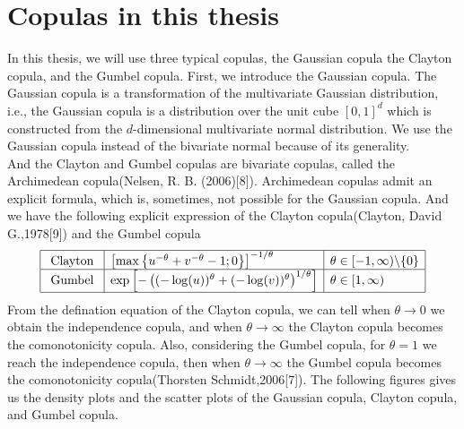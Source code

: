 \documentclass[mstat,12pt]{unswthesis}  %
\numberwithin{equation}{section}
\begin{document}
\section{Copulas in this thesis}
In this thesis, we will use three typical copulas, the Gaussian copula the Clayton copula, and the Gumbel copula. 
First, we introduce the Gaussian copula. The Gaussian copula is a transformation of the multivariate Gaussian distribution, i.e., the Gaussian copula is a distribution over the unit cube $[0,1]^d$ which is constructed from the $d$-dimensional multivariate normal distribution. We use the Gaussian copula instead of the bivariate normal because of its generality.\\
And the Clayton and Gumbel copulas are bivariate copulas, called the Archimedean copula(Nelsen, R. B. (2006)[8]). Archimedean copulas admit an explicit formula, which is, sometimes, not possible for the Gaussian copula. And we have the following explicit expression of the Clayton copula(Clayton, David G.,1978[9]) and the Gumbel copula
\begin{equation}
\begin{array}{|l|l|l|}
\hline \text { Clayton } & {\left[\max \left\{u^{-\theta}+v^{-\theta}-1 ; 0\right\}\right]^{-1 / \theta}} & \theta \in[-1, \infty) \backslash\{0\} \\
\hline \text { Gumbel } & \exp \left[-\left((-\log (u))^{\theta}+(-\log (v))^{\theta}\right)^{1 / \theta}\right] & \theta \in[1, \infty) \\
\hline
\end{array}
\end{equation}
From the defination equation of the Clayton copula, we can tell when $\theta \rightarrow 0$ we obtain the independence copula, and when $\theta \rightarrow \infty$ the Clayton copula becomes the comonotonicity copula. Also, considering the Gumbel copula, for $\theta=1$ we reach the independence copula, then when $\theta \rightarrow \infty$ the Gumbel copula becomes the comonotonicity copula(Thorsten Schmidt,2006[7]).
The following figures gives us the density plots and the scatter plots of the Gaussian copula, Clayton copula, and Gumbel copula.
\end{document}
